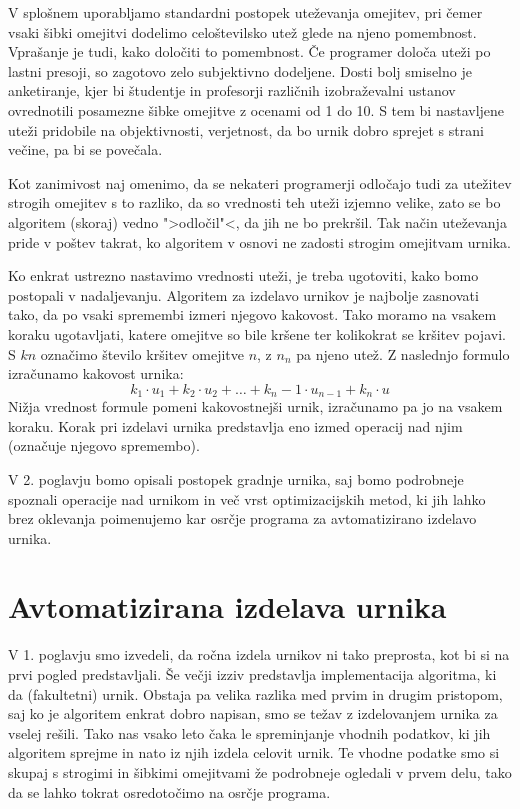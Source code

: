 \documentclass[a4paper,10pt]{article}
\begin{document}
V splošnem uporabljamo standardni postopek uteževanja omejitev, pri čemer vsaki šibki
omejitvi dodelimo celoštevilsko utež glede na njeno pomembnost. Vprašanje je tudi, kako
določiti to pomembnost. Če programer določa uteži po lastni presoji, so zagotovo zelo
subjektivno dodeljene. Dosti bolj smiselno je anketiranje, kjer bi študentje in profesorji
različnih izobraževalni ustanov ovrednotili posamezne šibke omejitve z ocenami od 1 do 10.
S tem bi nastavljene uteži pridobile na objektivnosti, verjetnost, da bo urnik dobro
sprejet s strani večine, pa bi se povečala.

Kot zanimivost naj omenimo, da se nekateri programerji odločajo tudi za utežitev strogih
omejitev s to razliko, da so vrednosti teh uteži izjemno velike, zato se bo algoritem
(skoraj) vedno ">odločil"<, da jih ne bo prekršil. Tak način uteževanja pride v poštev
takrat, ko algoritem v osnovi ne zadosti strogim omejitvam urnika.

Ko enkrat ustrezno nastavimo vrednosti uteži, je treba ugotoviti, kako bomo postopali
v nadaljevanju. Algoritem za izdelavo urnikov je najbolje zasnovati tako, da po vsaki
spremembi izmeri njegovo kakovost. Tako moramo na vsakem koraku ugotavljati, katere
omejitve so bile kršene ter kolikokrat se kršitev pojavi. S $kn$ označimo število
kršitev omejitve $n$, z $n_n$ pa njeno utež. Z naslednjo formulo izračunamo
kakovost urnika:
$$k_1 \cdot u_1 + k_2 \cdot u_2 + \ldots + {k_n-1} \cdot u_{n-1} + k_n \cdot u$$
Nižja vrednost formule pomeni kakovostnejši urnik, izračunamo pa jo na vsakem koraku.
Korak pri izdelavi urnika predstavlja eno izmed operacij nad njim (označuje njegovo
spremembo).

V 2. poglavju bomo opisali postopek gradnje urnika, saj bomo podrobneje spoznali
operacije nad urnikom in več vrst optimizacijskih metod, ki jih lahko brez oklevanja
poimenujemo kar osrčje programa za avtomatizirano izdelavo urnika.

\section{Avtomatizirana izdelava urnika }

V 1. poglavju smo izvedeli, da ročna izdela urnikov ni tako preprosta, kot bi si
na prvi pogled predstavljali. Še večji izziv predstavlja implementacija algoritma, ki da
(fakultetni) urnik. Obstaja pa velika razlika med prvim in drugim pristopom, saj ko je
algoritem enkrat dobro napisan, smo se težav z izdelovanjem urnika za vselej rešili.
Tako nas vsako leto čaka le spreminjanje vhodnih podatkov, ki jih algoritem sprejme in
nato iz njih izdela celovit urnik. Te vhodne podatke smo si skupaj s strogimi in šibkimi
omejitvami že podrobneje ogledali v prvem delu, tako da se lahko tokrat osredotočimo na
osrčje programa.
\end{document}
